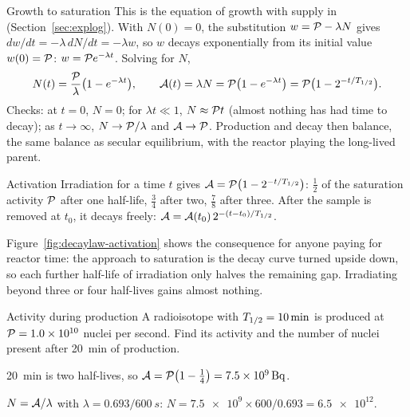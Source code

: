 \begin{derivbox}{Growth to saturation}
This is the equation of growth with supply in  (Section~\ref{sec:explog}). With
$N(0)=0$, the substitution $w=\mathcal{P}-\lambda N$ gives $dw/dt=-\lambda\,dN/dt=-\lambda w$, so $w$ decays
exponentially from its initial value $w(0)=\mathcal{P}$: $w=\mathcal{P} e^{-\lambda t}$. Solving for $N$,
\begin{equation}\label{eq:decaylaw-activation}
N(t)=\frac{\mathcal{P}}{\lambda}\big(1-e^{-\lambda t}\big),\qquad\mathcal{A}(t)=\lambda N=\mathcal{P}\big(1-e^{-\lambda t}\big)
=\mathcal{P}\big(1-2^{-t/T_{1/2}}\big).
\end{equation}
Checks: at $t=0$, $N=0$; for $\lambda t\ll1$, $N\approx\mathcal{P} t$ (almost nothing has had time to decay);
as $t\to\infty$, $N\to\mathcal{P}/\lambda$ and $\mathcal{A}\to\mathcal{P}$. Production and decay then balance, the same
balance as secular equilibrium, with the reactor playing the long-lived parent.
\end{derivbox}

\begin{keybox}{Activation}
Irradiation for a time $t$ gives $\mathcal{A}=\mathcal{P}\big(1-2^{-t/T_{1/2}}\big)$: $\tfrac12$ of the saturation
activity $\mathcal{P}$ after one half-life, $\tfrac34$ after two, $\tfrac78$ after three. After the sample is
removed at $t_0$, it decays freely: $\mathcal{A}=\mathcal{A}(t_0)\,2^{-(t-t_0)/T_{1/2}}$.
\end{keybox}

Figure~\ref{fig:decaylaw-activation} shows the consequence for anyone paying for reactor time: the
approach to saturation is the decay curve turned upside down, so each further half-life of irradiation
only halves the remaining gap. Irradiating beyond three or four half-lives gains almost nothing.

\begin{figure}[htbp]
\centering
{}
\end{figure}

\begin{exbox}{Activity during production}
A radioisotope with $T_{1/2}=\SI{10}{min}$ is produced at $\mathcal{P}=\num{1.0e10}$ nuclei per second. Find
its activity and the number of nuclei present after \SI{20}{min} of production.

 \SI{20}{min} is two half-lives, so $\Act=\Prod\big(1-\tfrac14\big)=\SI{7.5e9}{\becquerel}$.

 $N=\mathcal{A}/\lambda$ with $\lambda=0.693/\SI{600}{s}$:
$N=\num{7.5e9}\times600/0.693=\num{6.5e12}$.
\end{exbox}

